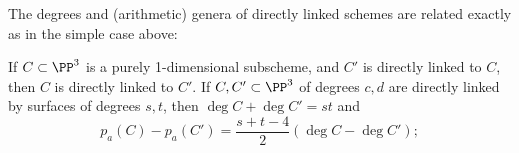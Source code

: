 %
%

The degrees and (arithmetic) genera 
of directly linked schemes are related exactly as in the simple case above:

\begin{theorem}\label{direct linkage}
If $C\subset \PP^3$ is a purely 1-dimensional subscheme, and ${C'}$ is directly linked to $C$, then $C$ is directly linked to ${C'}$.
If $C,{C'}\subset \PP^3$ of degrees $c,d$ are directly linked by surfaces of degrees $s,t$, then 
$\deg C+\deg C' = st$ and 
 \begin{equation}\label{linked genus formula}
p_a(C) - p_a({C'}) = \frac{s+t-4}{2}(\deg C - \deg C');
\end{equation}
\end{theorem}

